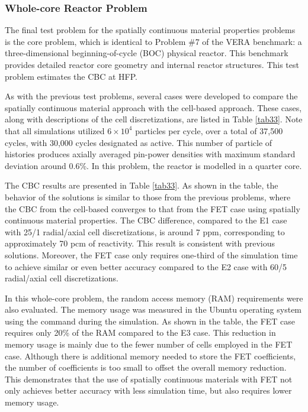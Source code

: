 \subsubsection{Whole-core Reactor Problem}

The final test problem for the spatially continuous material properties problems is the core problem, which is identical to Problem \#7 of the VERA benchmark: a three-dimensional beginning-of-cycle (BOC) physical reactor. This benchmark provides detailed reactor core geometry and internal reactor structures. This test problem estimates the CBC at HFP.

As with the previous test problems, several cases were developed to compare the spatially continuous material approach with the cell-based approach. These cases, along with descriptions of the cell discretizations, are listed in Table \ref{tab33}. Note that all simulations utilized \(6 \times 10^4\) particles per cycle, over a total of 37,500 cycles, with 30,000 cycles designated as active. This number of particle of histories produces axially averaged pin-power densities with maximum standard deviation around 0.6\%. In this problem, the reactor is modelled in a quarter core.

The CBC results are presented in Table \ref{tab33}. As shown in the table, the behavior of the solutions is similar to those from the previous problems, where the CBC from the cell-based converges to that from the FET case using spatially continuous material properties. The CBC difference, compared to the E1 case with 25/1 radial/axial cell discretizations, is around 7 ppm, corresponding to approximately 70 pcm of reactivity. This result is consistent with previous solutions. Moreover, the FET case only requires one-third of the simulation time to achieve similar or even better accuracy compared to the E2 case with 60/5 radial/axial cell discretizations.

In this whole-core problem, the random access memory (RAM) requirements were also evaluated. The memory usage was measured in the Ubuntu operating system using the  command during the simulation. As shown in the table, the FET case requires only 20\% of the RAM compared to the E3 case. This reduction in memory usage is mainly due to the fewer number of cells employed in the FET case. Although there is additional memory needed to store the FET coefficients, the number of coefficients is too small to offset the overall memory reduction. This demonstrates that the use of spatially continuous materials with FET not only achieves better accuracy with less simulation time, but also requires lower memory usage.

